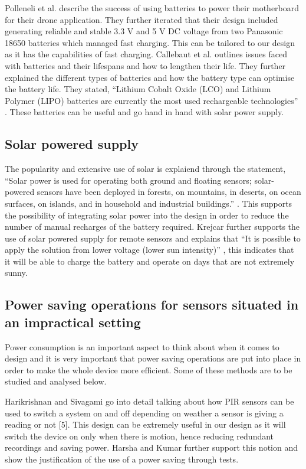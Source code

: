\documentclass[class=report,11pt,crop=false]{standalone}
\begin{document}
Polleneli et al. \cite{polonelli2020flexible} describe the success of using batteries to power their motherboard for their drone application. They further iterated that their design included generating reliable and stable 3.3 V and 5 V DC voltage from two Panasonic 18650 batteries which managed fast charging. This can be tailored to our design as it has the capabilities of fast charging. Callebaut et al. \cite{callebaut2021art} outlines issues faced with batteries and their lifespans and how to lengthen their life. They further explained the different types of batteries and how the battery type can optimise the battery life. They stated, “Lithium Cobalt Oxide (LCO) and Lithium Polymer (LIPO) batteries are currently the most used rechargeable technologies” \cite{callebaut2021art}. These batteries can be useful and go hand in hand with solar power supply.

\subsection{Solar powered supply}

The popularity and extensive use of solar is explaiend through the statement, “Solar power is used for operating both ground and floating sensors; solar-powered sensors have been deployed in forests, on mountains, in deserts, on ocean surfaces, on islands, and in household and industrial buildings.” \cite{dewan2014alternative}. This supports the possibility of integrating solar power into the design in order to reduce the number of manual recharges of the battery required. Krejcar further supports the use of solar powered supply for remote sensors and explains that “It is possible to apply the solution from lower voltage (lower sun intensity)” \cite{krejcar2012optimized}, this indicates that it will be able to charge the battery and operate on days that are not extremely sunny.

\subsection{Power saving operations for sensors situated in an impractical setting}

Power consumption is an important aspect to think about when it comes to design and it is very important that power saving operations are put into place in order to make the whole device more efficient. Some of these methods are to be studied and analysed below.

Harikrishnan and Sivagami \cite{harikirshnan2017intelligent} go into detail talking about how PIR sensors can be used to switch a system on and off depending on weather a sensor is giving a reading or not [5]. This design can be extremely useful in our design as it will switch the device on only when there is motion, hence reducing redundant recordings and saving power. Harsha and Kumar \cite{harsha2020home} further support this notion and show the justification of the use of a power saving through tests.
\end{document}

